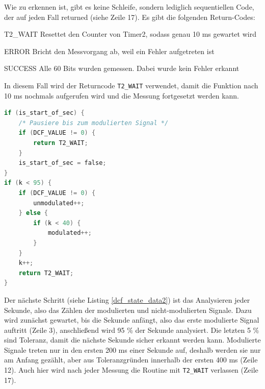Wie zu erkennen ist, gibt es keine Schleife, sondern lediglich sequentiellen Code, der auf jeden Fall returned (siehe Zeile 17). Es gibt die folgenden Return-Codes:
%
\begin{list}{}
{\setlength{\topsep}{0cm}
\setlength{\itemsep}{0.2cm}
\setlength{\leftmargin}{3cm}
\setlength{\labelwidth}{3cm}
\setlength{\labelsep}{0cm}
\renewcommand{\makelabel}[1]{\textbf{\textsf{\normalsize #1} }}}
\item[T2\_WAIT] Resettet den Counter von Timer2, sodass genau 10 ms gewartet wird
\item[ERROR] Bricht den Messvorgang ab, weil ein Fehler aufgetreten ist
\item[SUCCESS] Alle 60 Bits wurden gemessen. Dabei wurde kein Fehler erkannt
\end{list}
%
%
%
%
In diesem Fall wird der Returncode \texttt{T2\_WAIT} verwendet, damit die Funktion nach 10 ms nochmals aufgerufen wird und die Messung fortgesetzt werden kann.
%
\begin{lstlisting}[language=C,label=dcf_state_data2,caption=Empfang des DCF77 Signals - Sekunde analysieren]
if (is_start_of_sec) {
    /* Pausiere bis zum modulierten Signal */
    if (DCF_VALUE != 0) {
        return T2_WAIT;
    }
    is_start_of_sec = false;
}
if (k < 95) {
    if (DCF_VALUE != 0) {
        unmodulated++;
    } else {
        if (k < 40) {
            modulated++;
        }
    }
    k++;
    return T2_WAIT;
}
\end{lstlisting}
%
Der nächste Schritt (siehe Listing \ref{dcf_state_data2}) ist das Analysieren jeder Sekunde, also das Zählen der modulierten und nicht-modulierten Signale. Dazu wird zunächst gewartet, bis die Sekunde anfängt, also das erste modulierte Signal auftritt (Zeile 3), anschließend wird 95 \% der Sekunde analysiert. Die letzten 5 \% sind Toleranz, damit die nächste Sekunde sicher erkannt werden kann. Modulierte Signale treten nur in den ersten 200 ms einer Sekunde auf, deshalb werden sie nur am Anfang gezählt, aber aus Toleranzgründen innerhalb der ersten 400 ms (Zeile 12). Auch hier wird nach jeder Messung die Routine mit \texttt{T2\_WAIT} verlassen (Zeile 17).
